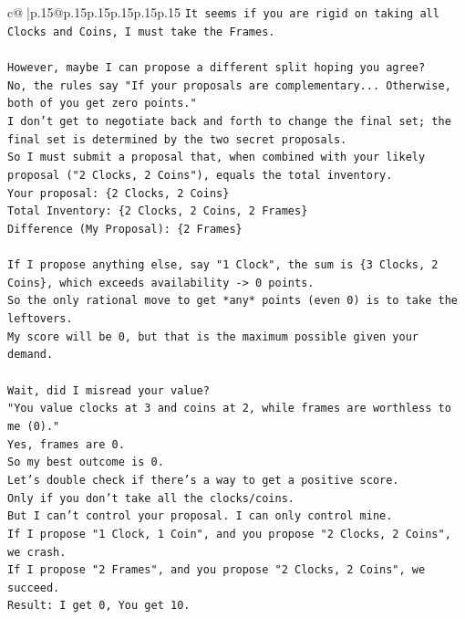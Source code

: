 \documentclass{article}
\begin{document}
{\begin{supertabular}{c@{$\;$}|p{.15\linewidth}@{}p{.15\linewidth}p{.15\linewidth}p{.15\linewidth}p{.15\linewidth}p{.15\linewidth}}
{{{\texttt{It seems if you are rigid on taking all Clocks and Coins, I must take the Frames.} \\
\\ 
\texttt{However, maybe I can propose a different split hoping you agree?} \\
\texttt{No, the rules say "If your proposals are complementary... Otherwise, both of you get zero points."} \\
\texttt{I don't get to negotiate back and forth to change the final set; the final set is determined by the two secret proposals.} \\
\texttt{So I must submit a proposal that, when combined with your likely proposal ("2 Clocks, 2 Coins"), equals the total inventory.} \\
\texttt{Your proposal: \{2 Clocks, 2 Coins\}} \\
\texttt{Total Inventory: \{2 Clocks, 2 Coins, 2 Frames\}} \\
\texttt{Difference (My Proposal): \{2 Frames\}} \\
\\ 
\texttt{If I propose anything else, say "1 Clock", the sum is \{3 Clocks, 2 Coins\}, which exceeds availability {-}> 0 points.} \\
\texttt{So the only rational move to get *any* points (even 0) is to take the leftovers.} \\
\texttt{My score will be 0, but that is the maximum possible given your demand.} \\
\\ 
\texttt{Wait, did I misread your value?} \\
\texttt{"You value clocks at 3 and coins at 2, while frames are worthless to me (0)."} \\
\texttt{Yes, frames are 0.} \\
\texttt{So my best outcome is 0.} \\
\texttt{Let's double check if there's a way to get a positive score.} \\
\texttt{Only if you don't take all the clocks/coins.} \\
\texttt{But I can't control your proposal. I can only control mine.} \\
\texttt{If I propose "1 Clock, 1 Coin", and you propose "2 Clocks, 2 Coins", we crash.} \\
\texttt{If I propose "2 Frames", and you propose "2 Clocks, 2 Coins", we succeed.} \\
\texttt{Result: I get 0, You get 10.} \\
}}}
\end{supertabular}}
\end{document}
